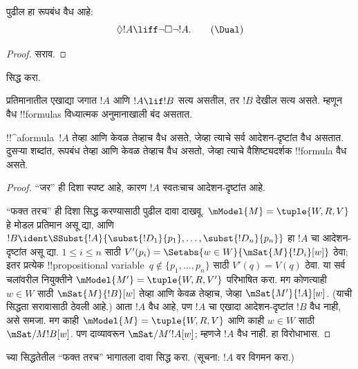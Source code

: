 \documentclass[../../../include/open-logic-section]{subfiles}
\begin{document}
\begin{prop}
  पुढील \Dual{} हा रूपबंध वैध आहे:
  \begin{equation*}
  \Diamond !A \liff \lnot\Box\lnot !A. \tag{\Dual}
  \end{equation*}
\end{prop}

\begin{proof}
  सराव.
\end{proof}

\begin{prob}
   सिद्ध करा.
\end{prob}

\begin{prop}
  प्रतिमानातील एखाद्या जगात $!A$ आणि $!A \lif !B$ सत्य
  असतील, तर $!B$ देखील सत्य असते. म्हणून वैध !!{formula}s
  विध्यात्मक अनुमानाखाली बंद असतात.
\end{prop}

\begin{prop}
  !!^a{formula}~$!A$ तेव्हा आणि केवळ तेव्हाच वैध असते,
  जेव्हा त्याचे सर्व आदेशन-दृष्टांत वैध असतात. दुसऱ्या शब्दांत,
  रूपबंध तेव्हा आणि केवळ तेव्हाच वैध असतो, जेव्हा त्याचे
  वैशिष्ट्यदर्शक !!{formula} वैध असते.
\end{prop}

\begin{proof}
  ``जर'' ही दिशा स्पष्ट आहे, कारण $!A$ स्वतःचाच
  आदेशन-दृष्टांत आहे.

  ``फक्त तरच'' ही दिशा सिद्ध करण्यासाठी पुढील दावा दाखवू.
  $\mModel{M} = \tuple{W, R, V}$ हे मोडल प्रतिमान असू द्या,
  आणि $!B \ident
  \SSubst{!A}{\subst{!D_1}{p_1},\dots,\subst{!D_n}{p_n}}$ हा
  $!A$ चा आदेशन-दृष्टांत असू द्या. $1 \leq i \leq n$ साठी
  $V'(p_i) = \Setabs{w \in W}{\mSat{M}{!D_i}[w]}$ ठेवा;
  इतर प्रत्येक !!{propositional variable}~$q \notin \{p_1,\dots,p_n\}$
  साठी $V'(q)=V(q)$ ठेवा. या सर्व चलांवरील नियुक्तीने
  $\mModel{M'} = \tuple{W, R,V'}$ परिभाषित करा.
  मग कोणत्याही~$w \in W$ साठी
  $\mSat{M}{!B}[w]$ तेव्हा आणि केवळ तेव्हाच, जेव्हा
  $\mSat{M'}{!A}[w]$. (याची सिद्धता सरावासाठी ठेवली आहे.)
  आता $!A$ वैध आहे, पण $!A$ चा एखादा आदेशन-दृष्टांत
  $!B$ वैध नाही, असे समजा. मग काही
  $\mModel{M} = \tuple{W, R, V}$ आणि काही $w \in W$
  साठी $\mSat/{M}{!B}[w]$. पण दाव्यावरून
  $\mSat/{M'}{!A}[w]$; म्हणजे $!A$ वैध नाही. हा विरोधाभास.
\end{proof}

\begin{prob}
   च्या सिद्धतेतील
  ``फक्त तरच'' भागातला दावा सिद्ध करा. (सूचना:
  $!A$ वर विगमन करा.)
\end{prob}
\end{document}
